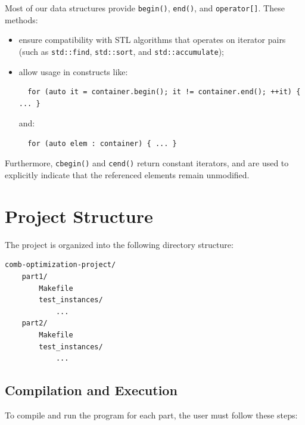 \documentclass[../main.tex]{subfiles}
\begin{document}
\begin{tcolorbox}[title=Note - Iterators and access operators]
Most of our data structures provide \texttt{begin()}, \texttt{end()}, and \texttt{operator[]}. These methods:	
\begin{itemize}
\item
 ensure compatibility with STL algorithms that operates on iterator pairs (such as \texttt{std::find}, \texttt{std::sort}, and \texttt{std::accumulate});
 \item allow usage in constructs like:
  \vspace{-10pt}  
\begin{verbatim}
  for (auto it = container.begin(); it != container.end(); ++it) { ... }
\end{verbatim}
  \vspace{-10pt}
and:
  \vspace{-10pt}
\begin{verbatim}
  for (auto elem : container) { ... }
\end{verbatim}
  \vspace{-10pt}
\end{itemize}
Furthermore, \texttt{cbegin()} and \texttt{cend()} return constant iterators, and are used to explicitly indicate that the referenced elements remain unmodified.
\end{tcolorbox}

\section{Project Structure}
The project is organized into the following directory structure:

\begin{verbatim}
comb-optimization-project/
    part1/
        Makefile
        test_instances/
            ...
    part2/
        Makefile
        test_instances/
            ...
\end{verbatim}
\subsection{Compilation and Execution}
To compile and run the program for each part, the user must follow these steps:
\end{document}
